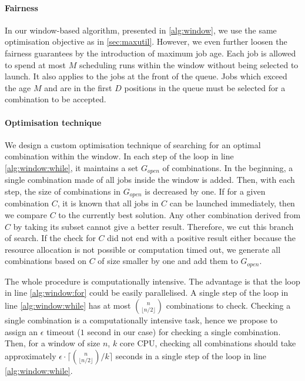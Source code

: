 \documentclass[thesis-en.tex]{subfiles}
\begin{document}
\paragraph{Fairness}
In our window-based algorithm, presented in \autoref{alg:window}, we use the same optimisation objective as in \autoref{sec:maxutil}. However, we even further loosen the fairness guarantees by the introduction of maximum job age. Each job is allowed to spend at most $M$ scheduling runs within the window without being selected to launch. It also applies to the jobs at the front of the queue. Jobs which exceed the age $M$ and are in the first $D$ positions in the queue must be selected for a combination to be accepted.

\paragraph{Optimisation technique}
We design a custom optimisation technique of searching for an optimal combination within the window. In each step of the loop in line \ref{alg:window:while}, it maintains a set $G_{open}$ of combinations. In the beginning, a single combination made of all jobs inside the window is added. Then, with each step, the size of combinations in $G_{open}$ is decreased by one. If for a given combination $C$, it is known that all jobs in $C$ can be launched immediately, then we compare $C$ to the currently best solution. Any other combination derived from $C$ by taking its subset cannot give a better result. Therefore, we cut this branch of search. If the check for $C$ did not end with a positive result either because the resource allocation is not possible or computation timed out, we generate all combinations based on $C$ of size smaller by one and add them to $G_{open}$.

The whole procedure is computationally intensive. The advantage is that the loop in line \ref{alg:window:for} could be easily parallelised. A single step of the loop in line \ref{alg:window:while} has at most ${{n}\choose{\lfloor n/2 \rfloor}}$ combinations to check. Checking a single combination is a computationally intensive task, hence we propose to assign an $\epsilon$ timeout ($1$ second in our case) for checking a single combination. Then, for a window of size $n$, $k$ core CPU, checking all combinations should take approximately $\epsilon \cdot \lceil {{n}\choose{\lfloor n/2 \rfloor}} / k \rceil$ seconds in a single step of the loop in line \ref{alg:window:while}.
\end{document}
